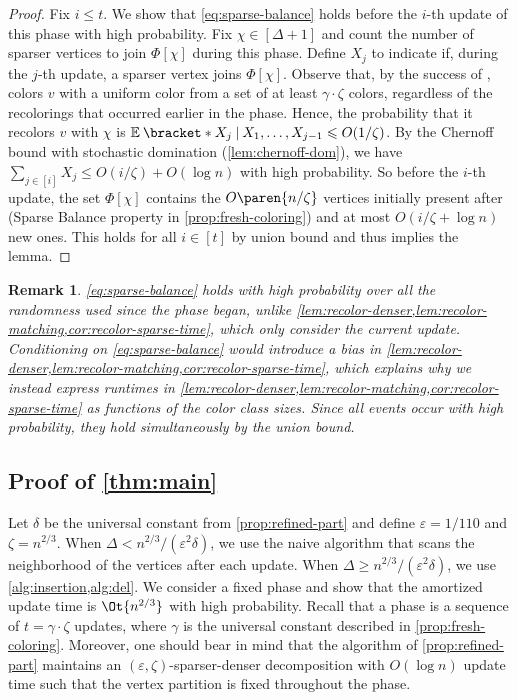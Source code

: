 \documentclass[a4paper,english,11pt]{amsart}
\newtheorem{remark}[lemma]{Remark}
\theoremstyle{definition}
\renewcommand{\leq}{\leqslant}
\renewcommand{\geq}{\geqslant}
\DeclarePairedDelimiter{\paren}()
\newcommand\given{ \nonscript\: \vert{} \nonscript\: \mathopen{} }
\newcommand{\eps}{\varepsilon}
\begin{document}
\begin{proof}
    Fix $i \leq t$. We show that \cref{eq:sparse-balance} holds before the $i$-th update of this phase with high probability. Fix $\chi \in [\Delta + 1]$ and count the number of sparser vertices to join $\Phi[\chi]$ during this phase. Define $X_j$ to indicate if, during the $j$-th update, a sparser vertex joins $\Phi[\chi]$. Observe that, by the success of \FreshColoring, \RecolorSparse colors $v$ with a uniform color from a set of at least $\gamma\cdot\zeta$ colors, regardless of the recolorings that occurred earlier in the phase. Hence, the probability that it recolors $v$ with $\chi$ is $\Exp*{ X_j \given X_1, \ldots, X_{j-1} }
    \leq O(1/\zeta)
    $.
    By the Chernoff bound with stochastic domination (\cref{lem:chernoff-dom}), we have $\sum_{j \in[i]} X_j \leq O(i/\zeta) + O(\log n)$ with high probability. So before the $i$-th update, the set $\Phi[\chi]$ contains the $O\paren{ n /\zeta }$ vertices initially present after \FreshColoring (Sparse Balance property in \cref{prop:fresh-coloring}) and at most $O(i/\zeta + \log n)$ new ones. This holds for all $i \in [t]$ by union bound and thus implies the lemma.
\end{proof}


\begin{remark}
    \cref{eq:sparse-balance} holds with high probability over all the randomness used since the phase began, unlike \cref{lem:recolor-denser,lem:recolor-matching,cor:recolor-sparse-time}, which only consider the current update. Conditioning on \cref{eq:sparse-balance} would introduce a bias in \cref{lem:recolor-denser,lem:recolor-matching,cor:recolor-sparse-time}, which explains why we instead express runtimes in \cref{lem:recolor-denser,lem:recolor-matching,cor:recolor-sparse-time} as functions of the color class sizes. Since all events occur with high probability, they hold simultaneously by the union bound.
\end{remark}




\subsection{Proof of \cref{thm:main}}
\label{sec:proof-theorem}

Let $\delta$ be the universal constant from \cref{prop:refined-part} and define $\eps = 1/110$ and $\zeta = n^{2/3}$.
When $\Delta < n^{2/3}/(\eps^2 \delta)$, we use the naive algorithm that scans the neighborhood of the vertices after each update. When $\Delta \geq n^{2/3}/(\eps^2\delta)$, we use \cref{alg:insertion,alg:del}. We consider a fixed phase and show that the amortized update time is $\Ot{ n^{2/3} }$ with high probability. Recall that a phase is a sequence of $t = \gamma \cdot \zeta$ updates, where $\gamma$ is the universal constant described in \cref{prop:fresh-coloring}. Moreover, one should bear in mind that the algorithm of \cref{prop:refined-part} maintains an $(\eps,\zeta)$-sparser-denser decomposition with $O(\log n)$ update time such that the vertex partition is fixed throughout the phase.
\end{document}
